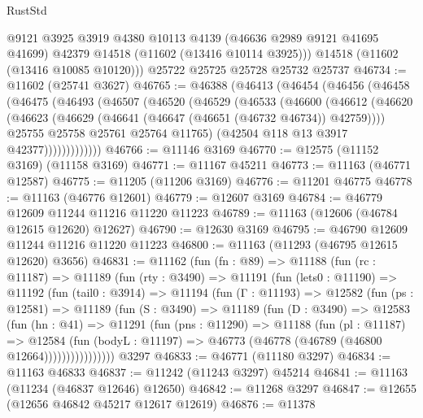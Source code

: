 \begin{lexlean}{RustStd}
\begin{coremodule}
        @9121
        @3925
        @3919
        @4380
        @10113
        @4139
        (@46636 @2989 @9121 @41695 @41699)
        @42379
        @14518
        (@11602 (@13416 @10114 @3925)))
      @14518
      (@11602 (@13416 @10085 @10120)))
    @25722
    @25725
    @25728
    @25732
    @25737
@46734 := @11602 (@25741 @3627)
@46765 := @46388
    (@46413
      (@46454
        (@46456
          (@46458
            (@46475
              (@46493
                (@46507
                  (@46520
                    (@46529
                      (@46533
                        (@46600
                          (@46612
                            (@46620
                              (@46623 (@46629 (@46641 (@46647 (@46651 (@46732 @46734)) @42759))))
                              @25755
                              @25758
                              @25761
                              @25764
                              @11765)
                            (@42504 @118 @13 @3917 @42377)))))))))))))
@46766 := @11146 @3169
@46770 := @12575 (@11152 @3169) (@11158 @3169)
@46771 := @11167 @45211
@46773 := @11163 (@46771 @12587)
@46775 := @11205 (@11206 @3169)
@46776 := @11201 @46775
@46778 := @11163 (@46776 @12601)
@46779 := @12607 @3169
@46784 := @46779 @12609 @11244 @11216 @11220 @11223
@46789 := @11163 (@12606 (@46784 @12615 @12620) @12627)
@46790 := @12630 @3169
@46795 := @46790 @12609 @11244 @11216 @11220 @11223
@46800 := @11163 (@11293 (@46795 @12615 @12620) @3656)
@46831 := @11162
    (fun (fn : @89) =>
    @11188
      (fun (rc : @11187) =>
      @11189
        (fun (rty : @3490) =>
        @11191
          (fun (lets0 : @11190) =>
          @11192
            (fun (tail0 : @3914) =>
            @11194
              (fun (Γ : @11193) =>
              @12582
                (fun (ps : @12581) =>
                @11189
                  (fun (S : @3490) =>
                  @11189
                    (fun (D : @3490) =>
                    @12583
                      (fun (hn : @41) =>
                      @11291
                        (fun (pns : @11290) =>
                        @11188
                          (fun (pl : @11187) =>
                          @12584
                            (fun (bodyL : @11197) =>
                            @46773 (@46778 (@46789 (@46800 @12664))))))))))))))))
    @3297
@46833 := @46771 (@11180 @3297)
@46834 := @11163 @46833
@46837 := @11242 (@11243 @3297) @45214
@46841 := @11163 (@11234 (@46837 @12646) @12650)
@46842 := @11268 @3297
@46847 := @12655 (@12656 @46842 @45217 @12617 @12619)
@46876 := @11378

\end{coremodule}
\end{lexlean}
